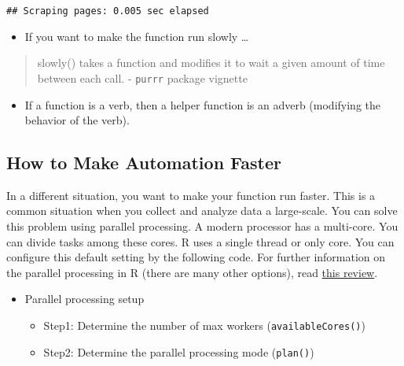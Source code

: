 \documentclass[
]{book}
\providecommand{\tightlist}{%
  \setlength{\itemsep}{0pt}\setlength{\parskip}{0pt}}
\begin{document}
\begin{verbatim}
## Scraping pages: 0.005 sec elapsed
\end{verbatim}

\begin{itemize}
\tightlist
\item
  If you want to make the function run slowly \ldots{}
\end{itemize}

\begin{quote}
slowly() takes a function and modifies it to wait a given amount of time between each call. - \texttt{purrr} package vignette
\end{quote}

\begin{itemize}
\tightlist
\item
  If a function is a verb, then a helper function is an adverb (modifying the behavior of the verb).
\end{itemize}

\hypertarget{how-to-make-automation-faster}{%
\subsection{How to Make Automation Faster}\label{how-to-make-automation-faster}}

In a different situation, you want to make your function run faster. This is a common situation when you collect and analyze data a large-scale. You can solve this problem using parallel processing. A modern processor has a multi-core. You can divide tasks among these cores. R uses a single thread or only core. You can configure this default setting by the following code. For further information on the parallel processing in R (there are many other options), read \href{https://yxue-me.com/post/2019-05-12-a-glossary-of-parallel-computing-packages-in-r-2019/}{this review}.

\begin{itemize}
\item
  Parallel processing setup

  \begin{itemize}
  \item
    Step1: Determine the number of max workers (\texttt{availableCores()})
  \item
    Step2: Determine the parallel processing mode (\texttt{plan()})
  \end{itemize}
\end{itemize}
\end{document}
